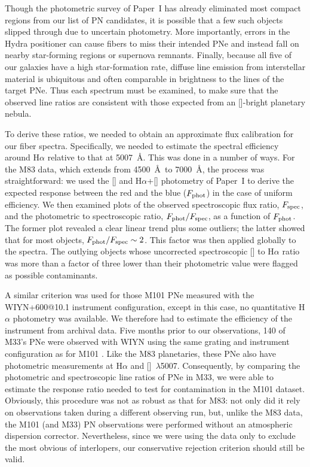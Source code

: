 \documentclass[12pt,preprint]{emulateapj}
\newcommand{\Oline}{[\ion{O}{3}]~$\lambda$5007}
\begin{document}
Though the photometric survey of Paper~I has already eliminated most compact  regions from our list of PN candidates, it is possible that a few such objects slipped through due to uncertain photometry.  More importantly, errors in the Hydra positioner can cause fibers to miss their intended PNe and instead fall on nearby star-forming regions or supernova remnants.  Finally, because all five of our galaxies have a high star-formation rate, diffuse line emission from interstellar material is ubiquitous and often comparable in brightness to the lines of the target PNe.  Thus each spectrum must be examined, to make sure that the observed line ratios are consistent with those expected from an []-bright planetary nebula.

To derive these ratios, we needed to obtain an approximate flux calibration for our fiber spectra.  Specifically, we needed to estimate the spectral efficiency around H$\alpha$ relative to that at 5007~\AA\null.   This was done in a number of ways.  For the M83 data, which extends from 4500~\AA\ to 7000~\AA, the process was straightforward:  we used the [] and H$\alpha$+[] photometry of Paper~I to derive the expected response between the red and the blue ($F_{\rm phot}$) in the case of uniform efficiency.  We then examined plots of the observed spectroscopic flux ratio, $F_{\rm spec}$, and the photometric to spectroscopic ratio,  $F_{\rm phot}/F_{\rm spec}$, as a function of $F_{\rm phot}$.  The former plot revealed a clear linear trend plus some outliers; the latter showed that for most objects, $F_{\rm phot}/F_{\rm spec}\sim 2$.  This factor was then applied globally to the spectra.  The outlying objects whose uncorrected spectroscopic [] to H$\alpha$ ratio was more than a factor of three lower than their photometric value were flagged as possible contaminants.

A similar criterion was used for those M101 PNe measured with the WIYN+600@10.1 instrument configuration, except in this case, no quantitative H$\alpha$ photometry was available.  We therefore had to estimate the efficiency of the instrument from archival data.  Five months prior to our observations, 140 of M33's PNe were observed with WIYN using the same grating and instrument configuration as for M101 \citep{M33}.  Like the M83 planetaries, these PNe also have photometric measurements at H$\alpha$ and \Oline.  Consequently, by comparing the photometric and spectroscopic line ratios of PNe in M33, we were able to estimate the response ratio needed to test for contamination in the M101 dataset.  Obviously, this procedure was not as robust as that for M83:  not only did it rely on observations taken during a different observing run, but, unlike the M83 data, the M101 (and M33) PN observations were performed without an atmospheric dispersion corrector.  Nevertheless, since we were using the data only to exclude the most obvious of interlopers, our conservative rejection criterion should still be valid.
\end{document}
